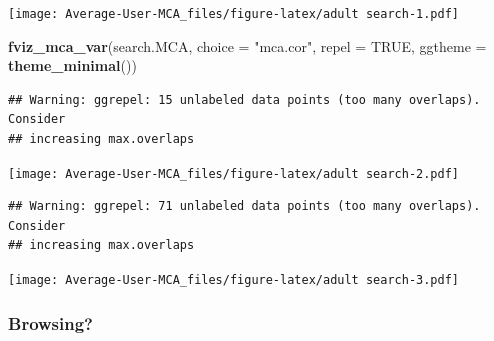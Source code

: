 \documentclass[
]{article}
\newenvironment{Shaded}{\begin{snugshade}}{\end{snugshade}}
\newcommand{\DataTypeTok}[1]{\textcolor[rgb]{0.13,0.29,0.53}{#1}}
\newcommand{\KeywordTok}[1]{\textcolor[rgb]{0.13,0.29,0.53}{\textbf{#1}}}
\newcommand{\NormalTok}[1]{#1}
\newcommand{\OtherTok}[1]{\textcolor[rgb]{0.56,0.35,0.01}{#1}}
\newcommand{\StringTok}[1]{\textcolor[rgb]{0.31,0.60,0.02}{#1}}
\begin{document}
\texttt{[image: Average-User-MCA\_files/figure-latex/adult search-1.pdf]}

\begin{Shaded}
\begin{Highlighting}[]
\KeywordTok{fviz_mca_var}\NormalTok{(search.MCA, }\DataTypeTok{choice =} \StringTok{"mca.cor"}\NormalTok{, }\DataTypeTok{repel =} \OtherTok{TRUE}\NormalTok{,}
             \DataTypeTok{ggtheme =} \KeywordTok{theme_minimal}\NormalTok{())}
\end{Highlighting}
\end{Shaded}

\begin{verbatim}
## Warning: ggrepel: 15 unlabeled data points (too many overlaps). Consider
## increasing max.overlaps
\end{verbatim}

\texttt{[image: Average-User-MCA\_files/figure-latex/adult search-2.pdf]}

\begin{Shaded}
\end{Shaded}

\begin{verbatim}
## Warning: ggrepel: 71 unlabeled data points (too many overlaps). Consider
## increasing max.overlaps
\end{verbatim}

\texttt{[image: Average-User-MCA\_files/figure-latex/adult search-3.pdf]}

\hypertarget{browsing-2}{%
\subsubsection{Browsing?}\label{browsing-2}}
\end{document}
